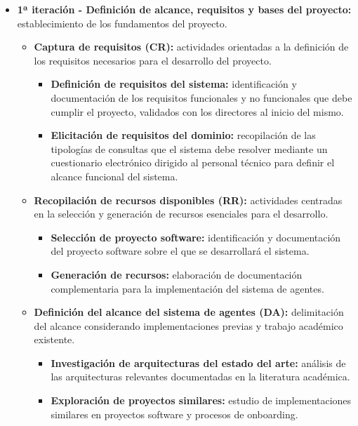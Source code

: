 \begin{itemize}
  \item\textbf{1ª iteración - Definición de alcance, requisitos y bases del proyecto: }establecimiento de los fundamentos del proyecto.
    \begin{itemize}
      \item\textbf{Captura de requisitos (CR):} actividades orientadas a la definición de los requisitos necesarios para el desarrollo del proyecto.
            \begin{itemize}
          \item\textbf{Definición de requisitos del sistema:} identificación y documentación de los requisitos funcionales y no funcionales que debe cumplir el proyecto, validados con los directores al inicio del mismo.
          \item\textbf{Elicitación de requisitos del dominio:} recopilación de las tipologías de consultas que el sistema debe resolver mediante un cuestionario electrónico dirigido al personal técnico para definir el alcance funcional del sistema.
        \end{itemize}
      \item\textbf{Recopilación de recursos disponibles (RR):} actividades centradas en la selección y generación de recursos esenciales para el desarrollo.
        \begin{itemize}
          \item\textbf{Selección de proyecto software:} identificación y documentación del proyecto software sobre el que se desarrollará el sistema.
          \item\textbf{Generación de recursos:} elaboración de documentación complementaria para la implementación del sistema de agentes.
        \end{itemize}
      \item\textbf{Definición del alcance del sistema de agentes (DA):} delimitación del alcance considerando implementaciones previas y trabajo académico existente.
    \begin{itemize}
          \item\textbf{Investigación de arquitecturas del estado del arte:} análisis de las arquitecturas relevantes documentadas en la literatura académica.
          \item\textbf{Exploración de proyectos similares:} estudio de implementaciones similares en proyectos software y procesos de onboarding.
    \end{itemize}
      \end{itemize}

\end{itemize}

